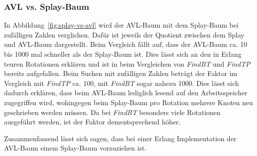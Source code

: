 \subsubsection{AVL vs. Splay-Baum}
In Abbildung~\ref{fig:splay-vs-avl} wird der AVL-Baum mit dem Splay-Baum bei zufälligen Zahlen
verglichen.
Dafür ist jeweils der Quotient zwischen dem Splay und AVL-Baum dargestellt.
Beim Vergleich fällt auf, dass der AVL-Baum ca. 10 bis 1000 mal schneller als der Splay-Baum ist.
Dies lässt sich an den in Erlang teuren Rotationen erklären und ist in beim Vergleichen von
\textit{FindBT} und \textit{FindTP} bereits aufgefallen.
Beim Suchen mit zufälligen Zahlen beträgt der Faktor im Vergleich mit \textit{FindTP} ca. 100, mit
\textit{FindBT} sogar nahezu 1000.
Dies lässt sich dadurch erklären, dass beim AVL-Baum lediglich lesend auf den
Arbeitsspeicher zugegriffen wird, wohingegen beim Splay-Baum pro Rotation mehrere Knoten neu
geschrieben werden müssen.
Da bei \textit{FindBT} besonders viele Rotationen ausgeführt werden, ist der Faktor dementsprechend
höher.

Zusammenfassend lässt sich sagen, dass bei einer Erlang Implementation der AVL-Baum einem
Splay-Baum vorzuziehen ist.
